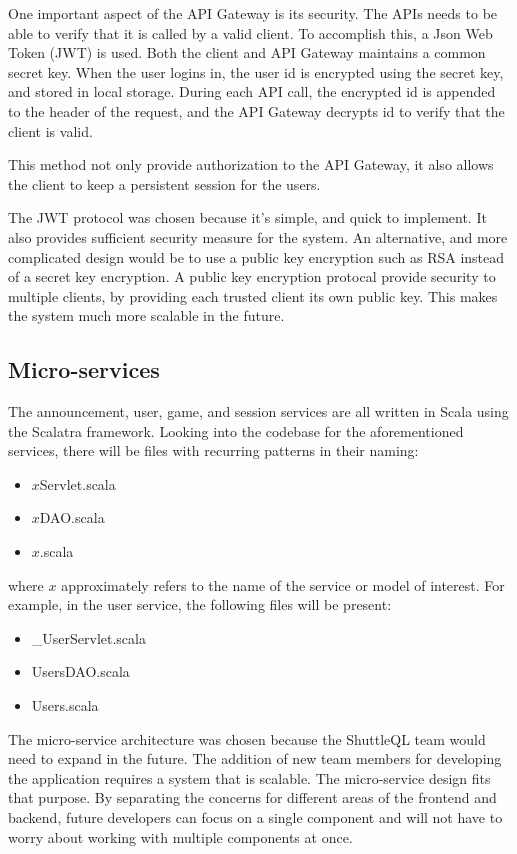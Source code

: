 \documentclass{article}
\begin{document}
One important aspect of the API Gateway is its security. The APIs needs to be able to verify that it is called by a valid client. To accomplish this, a Json Web Token (JWT) is used. Both the client and API Gateway maintains a common secret key. When the user logins in, the user id is encrypted using the secret key, and stored in local storage. During each API call, the encrypted id is appended to the header of the request, and the API Gateway decrypts id to verify that the client is valid.

This method not only provide authorization to the API Gateway, it also allows the client to keep a persistent session for the users.

The JWT protocol was chosen because it's simple, and quick to implement. It also provides sufficient security measure for the system. An alternative, and more complicated design would be to use a public key encryption such as RSA instead of a secret key encryption. A public key encryption protocal provide security to multiple clients, by providing each trusted client its own public key. This makes the system much more scalable in the future.

\subsection{Micro-services}
The announcement, user, game, and session services are all written in Scala using the Scalatra framework. Looking into the codebase for the aforementioned services, there will be files with recurring patterns in their naming:

\begin{itemize}
  \item $x$Servlet.scala
  \item $x$DAO.scala
  \item $x$.scala
\end{itemize}

where $x$ approximately refers to the name of the service or model of interest. For example, in the user service, the following files will be present:

\begin{itemize}
  \item \_UserServlet.scala
  \item UsersDAO.scala
  \item Users.scala
\end{itemize}

The micro-service architecture was chosen because the ShuttleQL team would need to expand in the future. The addition of new team members for developing the application requires a system that is scalable. The micro-service design fits that purpose. By separating the concerns for different areas of the frontend and backend, future developers can focus on a single component and will not have to worry about working with multiple components at once.
\end{document}
